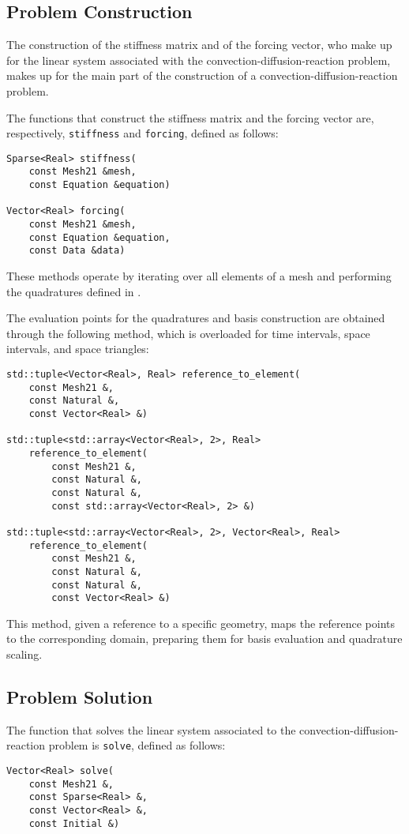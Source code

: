 \newpage
\subsection{Problem Construction}

The construction of the stiffness matrix and of the forcing vector, who make up for the linear system associated with the convection-diffusion-reaction problem, makes up for the main part of the construction of a convection-diffusion-reaction problem.

The functions that construct the stiffness matrix and the forcing vector are, respectively, \lstinline{stiffness} and \lstinline{forcing}, defined as follows:
\begin{lstlisting}[style=cpp]
Sparse<Real> stiffness(
    const Mesh21 &mesh, 
    const Equation &equation)

Vector<Real> forcing(
    const Mesh21 &mesh, 
    const Equation &equation, 
    const Data &data)
\end{lstlisting}
These methods operate by iterating over all elements of a mesh and performing the quadratures defined in .

The evaluation points for the quadratures and basis construction are obtained through the following method, which is overloaded for time intervals, space intervals, and space triangles:
\begin{lstlisting}[style=cpp]
std::tuple<Vector<Real>, Real> reference_to_element(
    const Mesh21 &, 
    const Natural &, 
    const Vector<Real> &)

std::tuple<std::array<Vector<Real>, 2>, Real> 
    reference_to_element(
        const Mesh21 &, 
        const Natural &, 
        const Natural &, 
        const std::array<Vector<Real>, 2> &)

std::tuple<std::array<Vector<Real>, 2>, Vector<Real>, Real> 
    reference_to_element(
        const Mesh21 &, 
        const Natural &, 
        const Natural &, 
        const Vector<Real> &)
\end{lstlisting}
This method, given a reference to a specific geometry, maps the reference points to the corresponding domain, preparing them for basis evaluation and quadrature scaling.

\newpage
\subsection{Problem Solution}

The function that solves the linear system associated to the convection-diffusion-reaction problem is \lstinline{solve}, defined as follows:
\begin{lstlisting}[style=cpp]
Vector<Real> solve(
    const Mesh21 &, 
    const Sparse<Real> &, 
    const Vector<Real> &, 
    const Initial &)
\end{lstlisting}

